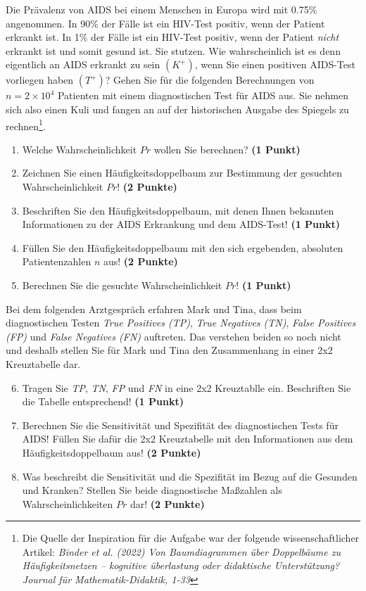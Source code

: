 \documentclass[a4paper, 9pt]{scrartcl}\usepackage[]{graphicx}\usepackage[]{xcolor}
\begin{document}
Die Prävalenz von AIDS bei einem Menschen in Europa wird mit 0.75\% angenommen. In 90\% der Fälle ist ein HIV-Test positiv, wenn der Patient erkrankt ist. In 1\% der Fälle ist ein HIV-Test positiv, wenn der Patient \textit{nicht} erkrankt ist und somit gesund ist. Sie stutzen. Wie wahrscheinlich ist es denn eigentlich an AIDS erkrankt zu sein $(K^+)$, wenn Sie einen positiven AIDS-Test vorliegen haben $(T^+)$? Gehen Sie für die folgenden Berechnungen von $n = \ensuremath{2\times 10^{4}}$ Patienten mit einem diagnostischen Test für AIDS aus. Sie nehmen sich also einen Kuli und fangen an auf der historischen Ausgabe des Spiegels zu rechnen\footnote{Die Quelle der Inspiration für die Aufgabe war der folgende wissenschaftlicher Artikel: \textit{Binder et al. (2022) Von Baumdiagrammen über Doppelbäume zu Häufigkeitsnetzen -- kognitive überlastung oder didaktische Unterstützung? Journal für Mathematik-Didaktik, 1-33}}.


\begin{enumerate}
\item Welche Wahrscheinlichkeit $Pr$ wollen Sie berechnen? \textbf{(1 Punkt)}
\item Zeichnen Sie einen Häufigkeitsdoppelbaum zur Bestimmung der gesuchten Wahrscheinlichkeit $Pr$! \textbf{(2 Punkte)} \item Beschriften Sie den Häufigkeitsdoppelbaum, mit denen Ihnen bekannten Informationen zu der AIDS Erkrankung und dem AIDS-Test! \textbf{(1 Punkt)}
\item Füllen Sie den Häufigkeitsdoppelbaum mit den sich ergebenden, absoluten Patientenzahlen $n$ aus! \textbf{(2 Punkte)}
\item Berechnen Sie die gesuchte Wahrscheinlichkeit $Pr$! \textbf{(1 Punkt)}
\end{enumerate}

Bei dem folgenden Arztgespräch erfahren Mark und Tina, dass beim diagnostischen Testen \textit{True Positives (TP)}, \textit{True Negatives (TN)}, \textit{False Positives (FP)} und \textit{False Negatives (FN)} auftreten. Das verstehen beiden so noch nicht und deshalb stellen Sie für Mark und Tina den Zusammenhang in einer 2x2 Kreuztabelle dar.

\begin{enumerate}
  \setcounter{enumi}{5}
\item Tragen Sie \textit{TP}, \textit{TN}, \textit{FP} und \textit{FN} in eine 2x2 Kreuztablle ein. Beschriften Sie die Tabelle entsprechend! \textbf{(1 Punkt)}
\item Berechnen Sie die Sensitivität und Spezifität des diagnostischen Tests für AIDS! Füllen Sie dafür die 2x2 Kreuztabelle mit den Informationen aus dem Häufigkeitsdoppelbaum aus! \textbf{(2 Punkte)}
\item Was beschreibt die Sensitivität und die Spezifität im Bezug auf die Gesunden und Kranken? Stellen Sie beide diagnostische Maßzahlen als Wahrscheinlichkeiten $Pr$ dar! \textbf{(2 Punkte)} 
\end{enumerate}
\end{document}
